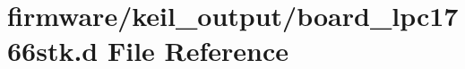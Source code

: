 \hypertarget{board__lpc1766stk_8d}{\section{firmware/keil\-\_\-output/board\-\_\-lpc1766stk.d File Reference}
\label{board__lpc1766stk_8d}
}
